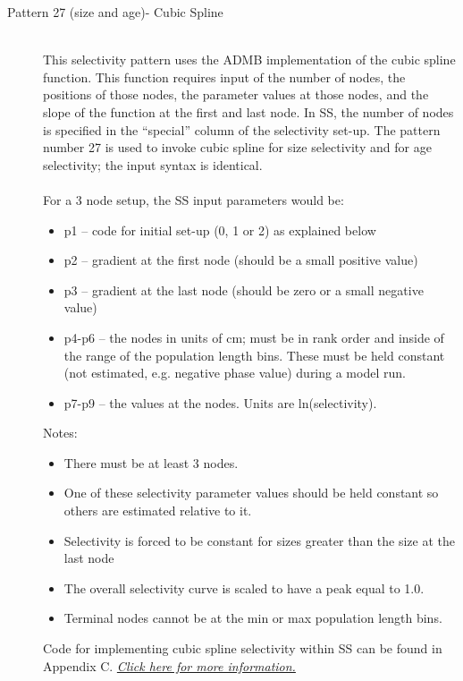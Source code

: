 \begin{description}
	\item[Pattern 27 (size and age)- Cubic Spline]\hfil\\
	This selectivity pattern uses the ADMB implementation of the cubic spline function. This function requires input of the number of nodes, the positions of those nodes, the parameter values at those nodes, and the slope of the function at the first and last node.  In SS, the number of nodes is specified in the “special” column of the selectivity set-up.  The pattern number 27 is used to invoke cubic spline for size selectivity and for age selectivity; the input syntax is identical.\\
	\\
	For a 3 node setup, the SS input parameters would be:
	\begin{itemize}
		\item p1 – 	code for initial set-up (0, 1 or 2) as explained below
		\item p2 – 	gradient at the first node (should be a small positive value)
		\item p3 – 	gradient at the last node (should be zero or a small negative value)
		\item p4-p6 – the nodes in units of cm; must be in rank order and inside of the range of the population length bins.  These must be held constant (not estimated, e.g. negative phase value) during a model run.
		\item  p7-p9 – the values at the nodes.  Units are ln(selectivity).
	\end{itemize}
	Notes:
	\begin{itemize}
		\item There must be at least 3 nodes.
		\item One of these selectivity parameter values should be held constant so others are estimated relative to it.
		\item Selectivity is forced to be constant for sizes greater than the size at the last node
		\item The overall selectivity curve is scaled to have a peak equal to 1.0.
		\item Terminal nodes cannot be at the min or max population length bins.
	\end{itemize}
	
	Code for implementing cubic spline selectivity within SS can be found in Appendix C. \hyperlink{CubicSpline}{\textit{Click here for more information.}}\\


\end{description}

